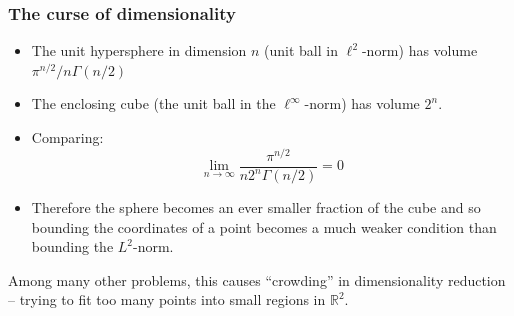 \documentclass{beamer}
\begin{document}
\begin{frame}
  \frametitle{The curse of dimensionality}

\begin{itemize}
\item  The unit hypersphere in dimension $n$ (unit ball in $\ell^{2}$-norm) has volume $\pi^{n/2}/n\Gamma(n/2)$

\item  The enclosing cube (the unit ball in the $\ell^{\infty}$-norm)  has volume $2^n$.

\item Comparing:
  $$
  \lim_{n\to\infty}\frac{\pi^{n/2}}{n2^{n}\Gamma(n/2)}= 0
  $$
\item
  Therefore the sphere becomes an ever smaller fraction of the cube and so bounding the coordinates of a point becomes a much weaker condition than
  bounding the $L^2$-norm.

\end{itemize}
  Among many other problems, this causes ``crowding'' in dimensionality reduction -- trying to fit too many points into small regions in $\mathbb{R}^{2}$.
\end{frame}
\end{document}

